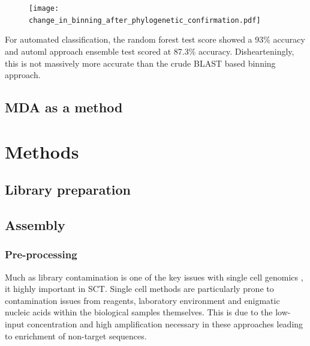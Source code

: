 \begin{figure}
    \texttt{[image: change\_in\_binning\_after\_phylogenetic\_confirmation.pdf]}
\end{figure}

For automated classification, the random forest test score showed a 93\% accuracy and automl approach ensemble test scored at 87.3\% accuracy.
Dishearteningly, this is not massively more accurate than the crude BLAST based binning approach.
     

\subsection{MDA as a method}




\section{Methods}


\subsection{Library preparation}



\subsection{Assembly}

\subsubsection{Pre-processing}
Much as library contamination is one of the key issues with single cell genomics \citep{Blainey2013,Lusk2014}, it highly
important in SCT.  Single cell methods are particularly prone to contamination issues
from reagents, laboratory environment and enigmatic nucleic acids within the biological samples themselves.
This is due to the low-input concentration and high amplification necessary in these approaches \citep{Blainey2013} 
leading to enrichment of non-target sequences.


